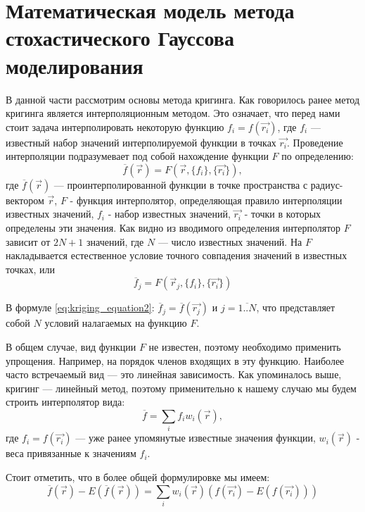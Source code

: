 \section{Математическая модель метода стохастического Гауссова моделирования} \label{sect1_2}
В данной части рассмотрим основы метода кригинга. Как говорилось ранее метод кригинга является интерполяционным методом. Это означает, что перед нами стоит задача интерполировать некоторую функцию $f_i = f(\vec{r_i})$, где $f_i$ — известный набор значений интерполируемой функции в точках $\vec{r_i}$. Проведение интерполяции подразумевает под собой нахождение функции $F$ по определению:
\begin{equation}
  \label{eq:kriging_equation1}
  \overline{f}(\vec{r}) = F(\vec{r}, \{f_i\}, \{\vec{r_i}\}),
\end{equation}
\noindent
где $\overline{f}(\vec{r})$ — проинтерполированной функции в точке пространства с радиус-вектором $\vec{r}$, $F$ - функция интерполятор, определяющая правило интерполяции известных значений, ${f_i}$ - набор известных значений, ${\vec{r_i}}$ - точки в которых определены эти значения. Как видно из вводимого определения интерполятор $F$ зависит от $2N + 1$ значений, где $N$ — число известных значений. На $F$ накладывается естественное условие точного совпадения значений в известных точках, или
\begin{equation}
  \label{eq:kriging_equation2}
  \overline{f}_j =  F(\vec{r}_j, \{f_i\}, \{\vec{r_i}\})
\end{equation}

В формуле \eqref{eq:kriging_equation2}: $\overline{f}_j = \overline{f}(\vec{r_j})$ и $j = \overline{1..N}$, что представляет собой $N$ условий налагаемых на функцию $F$.

В общем случае, вид функции $F$ не известен, поэтому необходимо применить упрощения. Например, на порядок членов входящих в эту функцию. Наиболее часто встречаемый вид — это линейная зависимость. Как упоминалось выше, кригинг — линейный метод, поэтому применительно к нашему случаю мы будем строить интерполятор вида:
\begin{equation}
  \label{eq:kriging_equation3}
  \overline{f} =  \sum_{i} f_i w_i(\vec{r}),
\end{equation}
\noindent
где $f_i = f(\vec{r_i})$ — уже ранее упомянутые известные значения функции, $w_i(\vec{r})$ - веса привязанные к значениям $f_i$.

Стоит отметить, что в более общей формулировке мы имеем:
\begin{equation}
  \label{eq:kriging_equation4}
  \overline{f}(\vec{r}) - E(\overline{f}(\vec{r})) =  \sum_{i} w_i(\vec{r}) (f(\vec{r_i}) - E(f(\vec{r_i})))
\end{equation}

